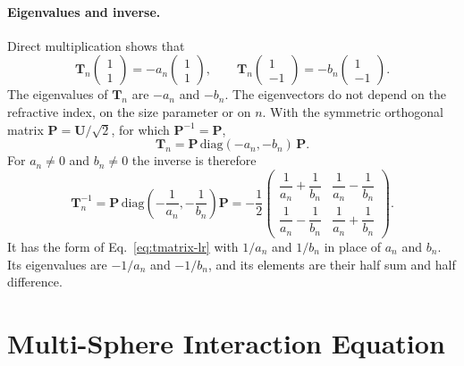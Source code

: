 \documentclass[11pt,a4paper]{article}
\begin{document}
\paragraph{Eigenvalues and inverse.}
Direct multiplication shows that
\begin{equation}
  \mathbf{T}_n \begin{pmatrix} 1 \\ 1 \end{pmatrix} = -a_n \begin{pmatrix} 1 \\ 1 \end{pmatrix}, \qquad
  \mathbf{T}_n \begin{pmatrix} 1 \\ -1 \end{pmatrix} = -b_n \begin{pmatrix} 1 \\ -1 \end{pmatrix}.
  \label{eq:tmatrix-eigen}
\end{equation}
The eigenvalues of $\mathbf{T}_n$ are $-a_n$ and $-b_n$.
The eigenvectors do not depend on the refractive index, on the size parameter or on $n$.
With the symmetric orthogonal matrix $\mathbf{P} = \mathbf{U}/\sqrt{2}$, for which $\mathbf{P}^{-1} = \mathbf{P}$,
\begin{equation}
  \mathbf{T}_n = \mathbf{P}\,\mathrm{diag}(-a_n, -b_n)\,\mathbf{P}.
  \label{eq:tmatrix-diagonal-form}
\end{equation}
For $a_n \neq 0$ and $b_n \neq 0$ the inverse is therefore
\begin{equation}
  \mathbf{T}_n^{-1} = \mathbf{P}\,\mathrm{diag}\!\left(-\frac{1}{a_n}, -\frac{1}{b_n}\right)\mathbf{P}
  = -\frac{1}{2}
  \begin{pmatrix} \dfrac{1}{a_n} + \dfrac{1}{b_n} & \dfrac{1}{a_n} - \dfrac{1}{b_n} \\[2ex]
                  \dfrac{1}{a_n} - \dfrac{1}{b_n} & \dfrac{1}{a_n} + \dfrac{1}{b_n} \end{pmatrix}.
  \label{eq:tmatrix-inverse}
\end{equation}
It has the form of Eq.~\eqref{eq:tmatrix-lr} with $1/a_n$ and $1/b_n$ in place of $a_n$ and $b_n$.
Its eigenvalues are $-1/a_n$ and $-1/b_n$, and its elements are their half sum and half difference.

\section{Multi-Sphere Interaction Equation}
\label{sec:multi-sphere}
\end{document}
